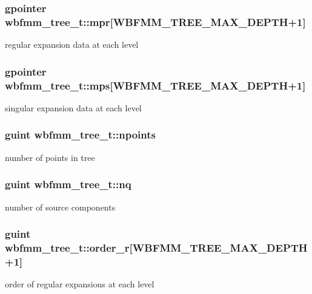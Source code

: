\subsubsection[{mpr}]{\setlength{\rightskip}{0pt plus 5cm}gpointer wbfmm\+\_\+tree\+\_\+t\+::mpr[W\+B\+F\+M\+M\+\_\+\+T\+R\+E\+E\+\_\+\+M\+A\+X\+\_\+\+D\+E\+P\+T\+H+1]}\label{structwbfmm__tree__t_a466a0bd76fd6539f493ce257df47dfad}
regular expansion data at each level 
\subsubsection[{mps}]{\setlength{\rightskip}{0pt plus 5cm}gpointer wbfmm\+\_\+tree\+\_\+t\+::mps[W\+B\+F\+M\+M\+\_\+\+T\+R\+E\+E\+\_\+\+M\+A\+X\+\_\+\+D\+E\+P\+T\+H+1]}\label{structwbfmm__tree__t_abea428ae644531258ba6d138ad727d29}
singular expansion data at each level 
\subsubsection[{npoints}]{\setlength{\rightskip}{0pt plus 5cm}guint wbfmm\+\_\+tree\+\_\+t\+::npoints}\label{structwbfmm__tree__t_a05dd3977f0f6f9266dfe5b4de1fd94ea}
number of points in tree 
\subsubsection[{nq}]{\setlength{\rightskip}{0pt plus 5cm}guint wbfmm\+\_\+tree\+\_\+t\+::nq}\label{structwbfmm__tree__t_a4201af7a54bb9d81e588ab619cecabbd}
number of source components 
\subsubsection[{order\+\_\+r}]{\setlength{\rightskip}{0pt plus 5cm}guint wbfmm\+\_\+tree\+\_\+t\+::order\+\_\+r[W\+B\+F\+M\+M\+\_\+\+T\+R\+E\+E\+\_\+\+M\+A\+X\+\_\+\+D\+E\+P\+T\+H+1]}\label{structwbfmm__tree__t_a3977c9974da5fbeaa66a9b1eea6fd235}
order of regular expansions at each level 

